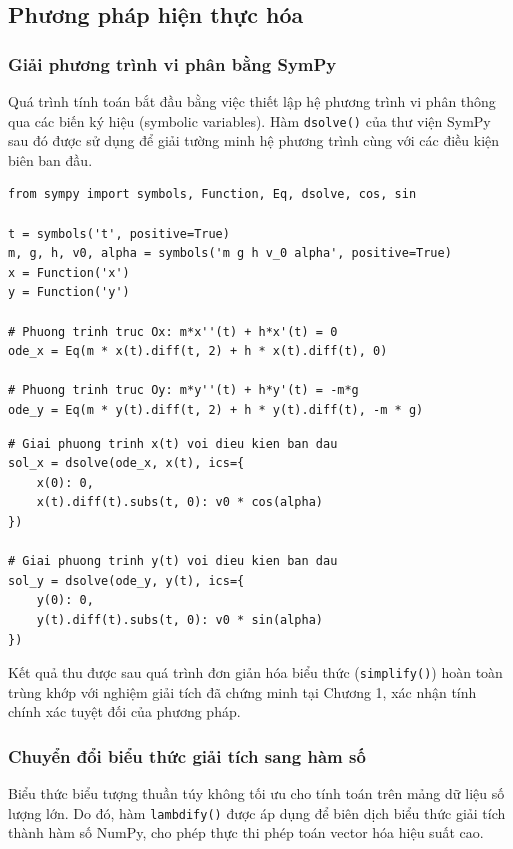 \subsection{Phương pháp hiện thực hóa}

\subsubsection{Giải phương trình vi phân bằng SymPy}
Quá trình tính toán bắt đầu bằng việc thiết lập hệ phương trình vi phân thông qua các biến ký hiệu (symbolic variables). Hàm \texttt{dsolve()} của thư viện SymPy sau đó được sử dụng để giải tường minh hệ phương trình cùng với các điều kiện biên ban đầu.

\begin{lstlisting}[style=pythonstyle, caption={Khởi tạo biến ký hiệu và thiết lập phương trình}]
from sympy import symbols, Function, Eq, dsolve, cos, sin

t = symbols('t', positive=True)
m, g, h, v0, alpha = symbols('m g h v_0 alpha', positive=True)
x = Function('x')
y = Function('y')

# Phuong trinh truc Ox: m*x''(t) + h*x'(t) = 0
ode_x = Eq(m * x(t).diff(t, 2) + h * x(t).diff(t), 0)

# Phuong trinh truc Oy: m*y''(t) + h*y'(t) = -m*g
ode_y = Eq(m * y(t).diff(t, 2) + h * y(t).diff(t), -m * g)
\end{lstlisting}

\begin{lstlisting}[style=pythonstyle, caption={Giải hệ phương trình vi phân với điều kiện ban đầu}]
# Giai phuong trinh x(t) voi dieu kien ban dau
sol_x = dsolve(ode_x, x(t), ics={
    x(0): 0,
    x(t).diff(t).subs(t, 0): v0 * cos(alpha)
})

# Giai phuong trinh y(t) voi dieu kien ban dau
sol_y = dsolve(ode_y, y(t), ics={
    y(0): 0,
    y(t).diff(t).subs(t, 0): v0 * sin(alpha)
})
\end{lstlisting}

Kết quả thu được sau quá trình đơn giản hóa biểu thức (\texttt{simplify()}) hoàn toàn trùng khớp với nghiệm giải tích đã chứng minh tại Chương 1, xác nhận tính chính xác tuyệt đối của phương pháp.

\subsubsection{Chuyển đổi biểu thức giải tích sang hàm số}
Biểu thức biểu tượng thuần túy không tối ưu cho tính toán trên mảng dữ liệu số lượng lớn. Do đó, hàm \texttt{lambdify()} được áp dụng để biên dịch biểu thức giải tích thành hàm số NumPy, cho phép thực thi phép toán vector hóa hiệu suất cao.

